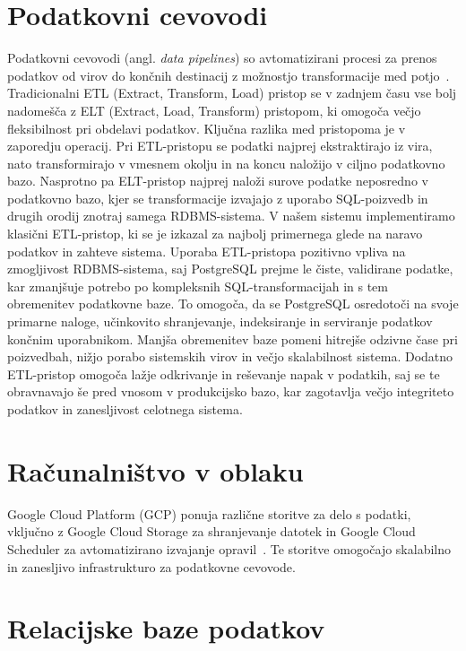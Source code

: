 \documentclass[a4paper,12pt,openright]{book}
\begin{document}
\section{Podatkovni cevovodi}

Podatkovni cevovodi (angl. \textit{data pipelines}) so avtomatizirani procesi za prenos podatkov od virov do končnih destinacij z možnostjo transformacije med potjo~\cite{wiese2019}. Tradicionalni ETL (Extract, Transform, Load) pristop se v zadnjem času vse bolj nadomešča z ELT (Extract, Load, Transform) pristopom, ki omogoča večjo fleksibilnost pri obdelavi podatkov.
Ključna razlika med pristopoma je v zaporedju operacij. Pri ETL-pristopu se podatki najprej ekstraktirajo iz vira, nato transformirajo v vmesnem okolju in na koncu naložijo v ciljno podatkovno bazo. Nasprotno pa ELT-pristop najprej naloži surove podatke neposredno v podatkovno bazo, kjer se transformacije izvajajo z uporabo SQL-poizvedb in drugih orodij znotraj samega RDBMS-sistema. 
V našem sistemu implementiramo klasični ETL-pristop, ki se je izkazal za najbolj primernega glede na naravo podatkov in zahteve sistema. 
Uporaba ETL-pristopa pozitivno vpliva na zmogljivost RDBMS-sistema, saj PostgreSQL prejme le čiste, validirane podatke, kar zmanjšuje potrebo po kompleksnih SQL-transformacijah in s tem obremenitev podatkovne baze. To omogoča, da se PostgreSQL osredotoči na svoje primarne naloge, učinkovito shranjevanje, indeksiranje in serviranje podatkov končnim uporabnikom. Manjša obremenitev baze pomeni hitrejše odzivne čase pri poizvedbah, nižjo porabo sistemskih virov in večjo skalabilnost sistema. Dodatno ETL-pristop omogoča lažje odkrivanje in reševanje napak v podatkih, saj se te obravnavajo še pred vnosom v produkcijsko bazo, kar zagotavlja večjo integriteto podatkov in zanesljivost celotnega sistema.

\section{Računalništvo v oblaku}

Google Cloud Platform (GCP) ponuja različne storitve za delo s podatki, vključno z Google Cloud Storage za shranjevanje datotek in Google Cloud Scheduler za avtomatizirano izvajanje opravil~\cite{gcp_docs}. Te storitve omogočajo skalabilno in zanesljivo infrastrukturo za podatkovne cevovode.

\section{Relacijske baze podatkov}
\end{document}
